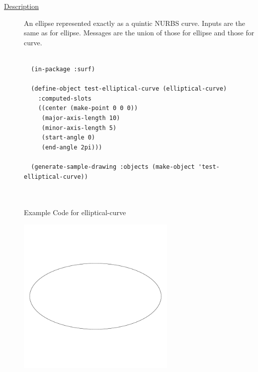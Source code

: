 \documentclass [11pt]{book}
\begin{document}
\begin{itemize}
\begin{description}

\item [
\underline{Description}]


An ellipse represented exactly as a quintic NURBS curve. Inputs are the same as for ellipse. 
Messages are the union of those for ellipse and those for curve.



\end{description}




\begin{figure}
\begin{lrbox}{\boxedverb}
\begin{minipage}{\linewidth}
{\small

\begin{verbatim}

  (in-package :surf)

  (define-object test-elliptical-curve (elliptical-curve)
    :computed-slots
    ((center (make-point 0 0 0)) 
     (major-axis-length 10) 
     (minor-axis-length 5) 
     (start-angle 0) 
     (end-angle 2pi)))
  
  (generate-sample-drawing :objects (make-object 'test-elliptical-curve))



\end{verbatim}}
\end{minipage}
\end{lrbox}
\fbox{\usebox{\boxedverb}}

\caption{Example Code for elliptical-curve}

\label{fig:example-code-elliptical-curve}

\end{figure}

\begin{figure}
\begin{center}
\includegraphics[width=3in,height=3in]{../images/example-elliptical-curve.pdf}
\end{center}


\end{figure}
\end{itemize}
\end{document}
